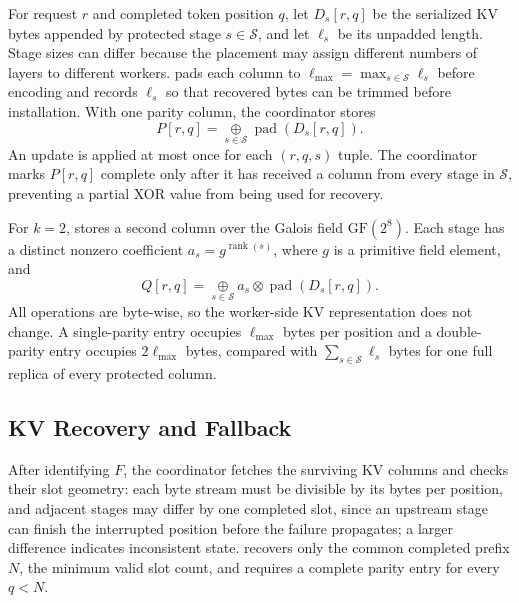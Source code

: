 For request $r$ and completed token position $q$, let $D_s[r,q]$ be the
serialized KV bytes appended by protected stage $s\in\mathcal{S}$, and let
$\ell_s$ be its unpadded length.  Stage sizes can differ because the placement
may assign different numbers of layers to different workers.  \sys{} pads
each column to $\ell_{\max}=\max_{s\in\mathcal{S}}\ell_s$ before encoding and
records $\ell_s$ so that recovered bytes can be trimmed before installation.
With one parity column, the coordinator stores
\begin{equation}\label{eq:single-parity}
  P[r,q] = \mathop{\oplus}\limits_{s\in\mathcal{S}}
            \operatorname{pad}\!\left(D_s[r,q]\right).
\end{equation}
An update is applied at most once for each $(r,q,s)$ tuple.  The coordinator
marks $P[r,q]$ complete only after it has received a column from every stage in
$\mathcal{S}$, preventing a partial XOR value from being used for recovery.

For $k=2$, \sys{} stores a second column over the Galois field
$\mathrm{GF}(2^8)$.  Each stage has a distinct nonzero coefficient $a_s=g^{\operatorname{rank}(s)}$, where
$g$ is a primitive field element, and
\begin{equation}\label{eq:double-parity}
  Q[r,q] = \mathop{\oplus}\limits_{s\in\mathcal{S}}
            a_s\otimes\operatorname{pad}\!\left(D_s[r,q]\right).
\end{equation}
All operations are byte-wise, so the worker-side KV representation does not
change.  A single-parity entry occupies $\ell_{\max}$ bytes per position and
a double-parity entry occupies $2\ell_{\max}$ bytes, compared with
$\sum_{s\in\mathcal{S}}\ell_s$ bytes for one full replica of every protected
column.

\subsection{KV Recovery and Fallback}\label{sec:design:recovery}
\label{sec:design:mirror}

After identifying $F$, the coordinator fetches the surviving KV columns and
checks their slot geometry: each byte stream must be divisible by its bytes
per position, and adjacent stages may differ by one completed slot, since an
upstream stage can finish the interrupted position before the failure
propagates; a larger difference indicates inconsistent state.  \sys{}
recovers only the common completed prefix $N$, the minimum valid slot count,
and requires a complete parity entry for every $q<N$.


